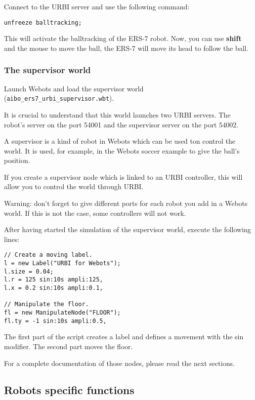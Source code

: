 Connect to the URBI server and use the following command:

\begin{lstlisting}[firstnumber=1,]
unfreeze balltracking;
\end{lstlisting}

 This will activate the balltracking of the ERS-{}7 robot.
Now, you can use \textbf{shift} and the mouse to move
the ball, the ERS-{}7 will move its head to follow the ball.


\subsubsection{The supervisor world}
\label{webots.builtin.worlds.supervisor}%

 Launch Webots and load the supervisor world
(\nolinkurl{aibo_ers7_urbi_supervisor.wbt}).


 It is crucial to understand that this world launches two URBI servers.
The robot's server on the port 54001 and the supervisor server on the
port 54002.


 A supervisor is a kind of robot in Webots which can be used ton control
the world. It is used, for example, in the Webots soccer example to give
the ball's position.


 If you create a supervisor node which is linked to an URBI controller,
this will allow you to control the world through URBI.


 Warning: don't forget to give different ports for each robot you add in a
Webots world. If this is not the case, some controllers will not work.


 After having started the simulation of the supervisor world, execute
the following lines:


\begin{lstlisting}[firstnumber=1,]
// Create a moving label.
l = new Label("URBI for Webots");
l.size = 0.04;
l.r = 125 sin:10s ampli:125,
l.x = 0.2 sin:10s ampli:0.1,

// Manipulate the floor.
fl = new ManipulateNode("FLOOR");
fl.ty = -1 sin:10s ampli:0.5,
\end{lstlisting}

 The first part of the script creates a label and defines a movement
with the sin modifier. The second part moves the floor.


For a complete documentation of those nodes, please read the
next sections.

\subsection{Robots specific functions}
\label{webots.builtin.robots}%

